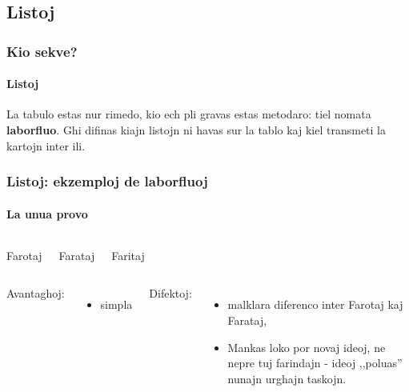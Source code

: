 
\subsection{Listoj}

  \begin{frame}
    \frametitle{Kio sekve?}
    \framesubtitle{Listoj}

	La tabulo estas nur rimedo, kio ech pli gravas estas metodaro: tiel nomata  \textbf{laborfluo}. Ghi difinas kiajn listojn ni havas sur la tablo kaj kiel transmeti la kartojn inter ili.
	
  \end{frame}

  \begin{frame}
    \frametitle{Listoj: ekzemploj de laborfluoj}
    \framesubtitle{La unua provo}
    
    	\begin{columns}
	    \begin{block}
	    
	    	Far\alert{ot}aj
	    	
	    \end{block}
    	\begin{block}
    	
    		Far\alert{at}aj
    		
   		\end{block}
    	\begin{block}
    	
    		Far\alert{it}aj
    		
    	\end{block}
	\end{columns}
    \vspace{1em}
    	\begin{columns}
    Avantaghoj:
    \begin{itemize}
    		\item simpla
    \end{itemize}
	\column{0.5\textwidth}
    Difektoj:
    \begin{itemize}
    		\item malklara diferenco inter Farotaj kaj Farataj,
    		\item Mankas loko por novaj ideoj, ne nepre tuj farindajn -  ideoj ,,poluas'' nunajn urghajn taskojn.
    \end{itemize}
    	
	\end{columns}
  \end{frame}


